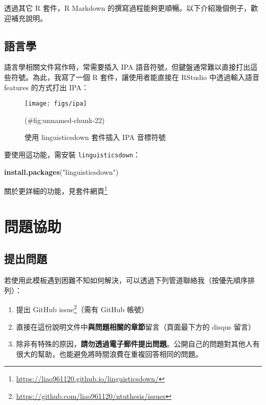 \documentclass[oneside]{book}
\newenvironment{Shaded}{\begin{snugshade}}{\end{snugshade}}
\newcommand{\KeywordTok}[1]{\textcolor[rgb]{0.13,0.29,0.53}{\textbf{#1}}}
\newcommand{\NormalTok}[1]{#1}
\newcommand{\StringTok}[1]{\textcolor[rgb]{0.31,0.60,0.02}{#1}}
\renewcommand{\href}[2]{#2\footnote{\url{#1}}}
\providecommand{\tightlist}{%
  \setlength{\itemsep}{0pt}\setlength{\parskip}{0pt}}
\begin{document}
透過其它 R 套件，R Markdown 的撰寫過程能夠更順暢。以下介紹幾個例子，歡迎補充說明。

\hypertarget{ling}{%
\section{語言學}\label{ling}}

語言學相關文件寫作時，常需要插入 IPA 語音符號，但鍵盤通常難以直接打出這些符號。為此，我寫了一個 R 套件，讓使用者能直接在 RStudio 中透過輸入語音 features 的方式打出 IPA：

\begin{figure}

{\centering \texttt{[image: figs/ipa]} 

}

\caption{使用 linguisticsdown 套件插入 IPA 音標符號}(\#fig:unnamed-chunk-22)
\end{figure}

要使用這功能，需安裝 \texttt{linguisticsdown}：

\begin{Shaded}
\begin{Highlighting}[]
\KeywordTok{install.packages}\NormalTok{(}\StringTok{"linguisticsdown"}\NormalTok{)}
\end{Highlighting}
\end{Shaded}

關於更詳細的功能，見\href{https://liao961120.github.io/linguisticsdown/}{套件網頁}

\hypertarget{feed-back}{%
\chapter*{問題協助}\label{feed-back}}

\hypertarget{issue}{%
\section*{提出問題}\label{issue}}

若使用此模板遇到困難不知如何解決，可以透過下列管道聯絡我（按優先順序排列）：

\begin{enumerate}
\def\labelenumi{\arabic{enumi}.}
\tightlist
\item
  提出 \href{https://github.com/liao961120/ntuthesis/issues}{GitHub issue}（需有 GitHub 帳號）
\item
  直接在這份說明文件中\textbf{與問題相關的章節}留言（頁面最下方的 disqus 留言）
\item
  除非有特殊的原因，\textbf{請勿透過電子郵件提出問題}。公開自己的問題對其他人有很大的幫助，也能避免將時間浪費在重複回答相同的問題。
\end{enumerate}
\end{document}
